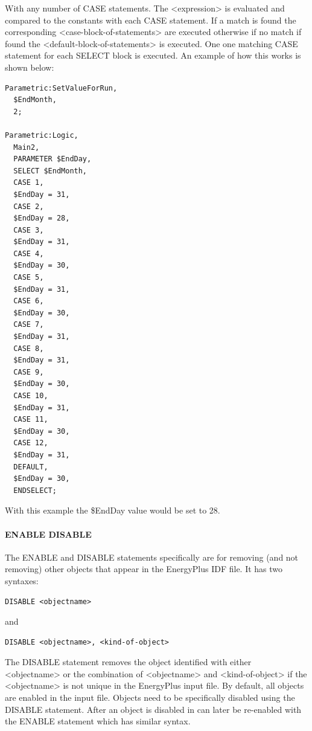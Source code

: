 With any number of CASE statements. The \textless{}expression\textgreater{} is evaluated and compared to the constants with each CASE statement. If a match is found the corresponding \textless{}case-block-of-statements\textgreater{} are executed otherwise if no match if found the \textless{}default-block-of-statements\textgreater{} is executed. One one matching CASE statement for each SELECT block is executed. An example of how this works is shown below:

\begin{lstlisting}
Parametric:SetValueForRun,
  $EndMonth,
  2;

Parametric:Logic,
  Main2,
  PARAMETER $EndDay,
  SELECT $EndMonth,
  CASE 1,
  $EndDay = 31,
  CASE 2,
  $EndDay = 28,
  CASE 3,
  $EndDay = 31,
  CASE 4,
  $EndDay = 30,
  CASE 5,
  $EndDay = 31,
  CASE 6,
  $EndDay = 30,
  CASE 7,
  $EndDay = 31,
  CASE 8,
  $EndDay = 31,
  CASE 9,
  $EndDay = 30,
  CASE 10,
  $EndDay = 31,
  CASE 11,
  $EndDay = 30,
  CASE 12,
  $EndDay = 31,
  DEFAULT,
  $EndDay = 30,
  ENDSELECT;
\end{lstlisting}

With this example the \$EndDay value would be set to 28.

\paragraph{ENABLE DISABLE}\label{enable-disable}

The ENABLE and DISABLE statements specifically are for removing (and not removing) other objects that appear in the EnergyPlus IDF file. It has two syntaxes:

\begin{lstlisting}
DISABLE <objectname>
\end{lstlisting}

and

\begin{lstlisting}
DISABLE <objectname>, <kind-of-object>
\end{lstlisting}

The DISABLE statement removes the object identified with either \textless{}objectname\textgreater{} or the combination of \textless{}objectname\textgreater{} and \textless{}kind-of-object\textgreater{} if the \textless{}objectname\textgreater{} is not unique in the EnergyPlus input file. By default, all objects are enabled in the input file. Objects need to be specifically disabled using the DISABLE statement. After an object is disabled in can later be re-enabled with the ENABLE statement which has similar syntax.

